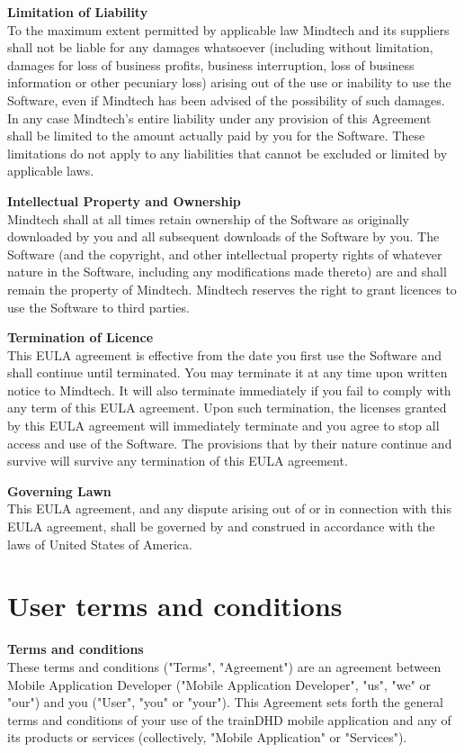 \documentclass[letterpaper,10pt]{article}
\let\oldsection\section
\renewcommand{\section}{\def\cursectioning{section}\oldsection}
\begin{document}
\begin{appendices}
\large{\textbf{Limitation of Liability}} \\
To the maximum extent permitted by applicable law Mindtech and its suppliers shall not be liable for any damages whatsoever (including without limitation, damages for loss of business profits, business interruption, loss of business information or other pecuniary loss) arising out of the use or inability to use the Software, even if Mindtech has been advised of the possibility of such damages. In any case Mindtech's entire liability under any provision of this Agreement shall be limited to the amount actually paid by you for the Software. These limitations do not apply to any liabilities that cannot be excluded or limited by applicable laws.


\large{\textbf{Intellectual Property and Ownership}} \\
Mindtech shall at all times retain ownership of the Software as originally downloaded by you and all subsequent downloads of the Software by you. The Software (and the copyright, and other intellectual property rights of whatever nature in the Software, including any modifications made thereto) are and shall remain the property of Mindtech.
Mindtech reserves the right to grant licences to use the Software to third parties.

\large{\textbf{Termination of Licence}} \\
This EULA agreement is effective from the date you first use the Software and shall continue until terminated. You may terminate it at any time upon written notice to Mindtech.
It will also terminate immediately if you fail to comply with any term of this EULA agreement. Upon such termination, the licenses granted by this EULA agreement will immediately terminate and you agree to stop all access and use of the Software. The provisions that by their nature continue and survive will survive any termination of this EULA agreement.

\large{\textbf{Governing Lawn}} \\
This EULA agreement, and any dispute arising out of or in connection with this EULA agreement, shall be governed by and construed in accordance with the laws of United States of America.


\section{User terms and conditions} 
\label{appendix:terms}

\large{\textbf{Terms and conditions}} \\
These terms and conditions ("Terms", "Agreement") are an agreement between Mobile Application Developer ("Mobile Application Developer", "us", "we" or "our") and you ("User", "you" or "your"). This Agreement sets forth the general terms and conditions of your use of the trainDHD mobile application and any of its products or services (collectively, "Mobile Application" or "Services").


\end{appendices}
\end{document}
